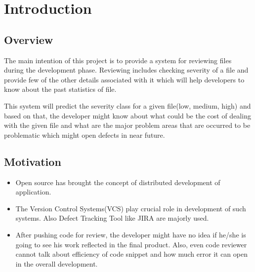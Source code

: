 \documentclass[oneside,a4paper,12pt]{book}
\renewcommand{\headrulewidth}{0pt}
\begin{document}
\setlength{\parindent}{11mm}

\pagestyle{fancy}
\fancyhf{}
\renewcommand{\headrulewidth}{2pt}
\renewcommand{\footrulewidth}{1pt}

\chapter{Introduction}

\section{Overview}
\setlength{\parskip}{0.0pt}
	\item The main intention of this project is to provide a system for reviewing files during the development phase. Reviewing includes checking severity of a file and provide few of the other details associated with it which will help developers to know about the past statistics of file.\par

\setlength{\parskip}{9.96pt}
	\item This system will predict the severity class for a given file(low, medium, high) and based on that, the developer might know about what could be the cost of dealing with the given file and what are the major problem areas that are occurred to be problematic which might open defects in near future.\par

\section{Motivation}
\setlength{\parskip}{0.0pt}
\begin{itemize}
	\item Open source has brought the concept of distributed development of application.\par

	\item The Version Control Systems(VCS) play crucial role in development of such systems. Also Defect Tracking Tool like JIRA are majorly used.\par

	\item After pushing code for review, the developer might have no idea if he/she is going to see his work reflected in the final product. Also, even code reviewer cannot talk about efficiency of code snippet and how much error it can open in the overall development.
\end{itemize}\par
\end{document}
